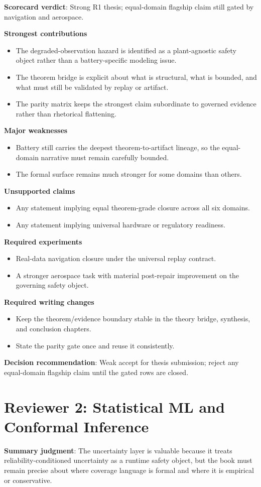 \textbf{Scorecard verdict}: Strong R1 thesis; equal-domain flagship claim still gated by navigation and aerospace.

\textbf{Strongest contributions}
\begin{itemize}
\item The degraded-observation hazard is identified as a plant-agnostic safety object rather than a battery-specific modeling issue.
\item The theorem bridge is explicit about what is structural, what is bounded, and what must still be validated by replay or artifact.
\item The parity matrix keeps the strongest claim subordinate to governed evidence rather than rhetorical flattening.
\end{itemize}
\textbf{Major weaknesses}
\begin{itemize}
\item Battery still carries the deepest theorem-to-artifact lineage, so the equal-domain narrative must remain carefully bounded.
\item The formal surface remains much stronger for some domains than others.
\end{itemize}
\textbf{Unsupported claims}
\begin{itemize}
\item Any statement implying equal theorem-grade closure across all six domains.
\item Any statement implying universal hardware or regulatory readiness.
\end{itemize}
\textbf{Required experiments}
\begin{itemize}
\item Real-data navigation closure under the universal replay contract.
\item A stronger aerospace task with material post-repair improvement on the governing safety object.
\end{itemize}
\textbf{Required writing changes}
\begin{itemize}
\item Keep the theorem/evidence boundary stable in the theory bridge, synthesis, and conclusion chapters.
\item State the parity gate once and reuse it consistently.
\end{itemize}
\textbf{Decision recommendation}: Weak accept for thesis submission; reject any equal-domain flagship claim until the gated rows are closed.

\section{Reviewer 2: Statistical ML and Conformal Inference}
\textbf{Summary judgment}: The uncertainty layer is valuable because it treats reliability-conditioned uncertainty as a runtime safety object, but the book must remain precise about where coverage language is formal and where it is empirical or conservative.

